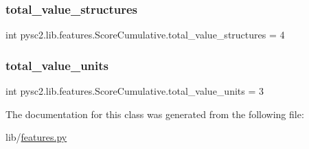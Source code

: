 \subsubsection{\texorpdfstring{total\+\_\+value\+\_\+structures}{total\_value\_structures}}
{\footnotesize\ttfamily int pysc2.\+lib.\+features.\+Score\+Cumulative.\+total\+\_\+value\+\_\+structures = 4\hspace{0.3cm}{\ttfamily [static]}}

\mbox{\label{classpysc2_1_1lib_1_1features_1_1_score_cumulative_a0d0e3e2d4ab6bf8b8db97fe0d877193e}} 
\subsubsection{\texorpdfstring{total\+\_\+value\+\_\+units}{total\_value\_units}}
{\footnotesize\ttfamily int pysc2.\+lib.\+features.\+Score\+Cumulative.\+total\+\_\+value\+\_\+units = 3\hspace{0.3cm}{\ttfamily [static]}}



The documentation for this class was generated from the following file\+:\begin{DoxyCompactItemize}
\item 
lib/\mbox{\hyperlink{features_8py}{features.\+py}}\end{DoxyCompactItemize}
